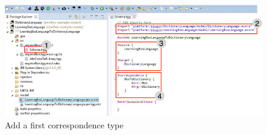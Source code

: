 \begin{figure}[htbp]
\begin{center}
  \includegraphics[width=\textwidth]{newSchema}
  \caption{Add a first correspondence type}  
  \label{newSchema}
\end{center}
\end{figure}





